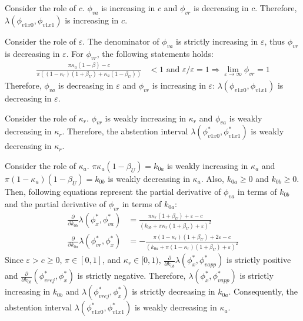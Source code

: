 \par Consider the role of $c$. $\phi_{va}$ is increasing in $c$ and $\phi_{vr}$ is decreasing in $c$. Therefore, $\lambda(\phi_{v1x0},\phi_{v1x1})$ is increasing in $c$. 

\par Consider the role of $\varepsilon$. The denominator of $\phi_{va}$ is strictly increasing in $\varepsilon$, thus $\phi_{vr}$ is decreasing in $\varepsilon$. For $\phi_{vr}$, the following statements holds:
\begin{align*}
\frac{\pi \kappa_{a} (1-\beta) - c}{\pi ( (1-\kappa_{r}) (1+\beta_U) + \kappa_{a} (1-\beta_U))} &< 1 \text{ and } \varepsilon/\varepsilon = 1 \Rightarrow \lim_{\varepsilon \to \infty} \phi_{vr} = 1 
\end{align*}
\noindent Therefore, $\phi_{va}$ is decreasing in $\varepsilon$ and $\phi_{vr}$ is increasing in $\varepsilon$: $\lambda(\phi_{v1x0},\phi_{v1x1})$ is decreasing in $\varepsilon$.

\par Consider the role of $\kappa_{r}$. $\phi_{vr}$ is weakly increasing in $\kappa_{r}$ and $\phi_{va}$ is weakly decreasing in $\kappa_{r}$. Therefore, the abstention interval $\lambda (\phi^*_{v1x0}, \phi^*_{v1x1})$ is weakly decreasing in $\kappa_{r}$. 

\par Consider the role of $\kappa_{a}$. $\pi \kappa_{a} (1-\beta_U)= k_{0a}$ is weakly increasing in  $\kappa_{a}$  and $\pi (1-\kappa_{a}) (1-\beta_U) = k_{0b}$ is weakly decreasing in $\kappa_{a}$. Also, $k_{0a} \geq 0$ and $k_{0b} \geq 0$. Then, following equations represent the partial derivative of $\phi_{va}$ in terms of $k_{0b}$ and the partial derivative of $\phi_{vr}$ in terms of $k_{0a}$:
\begin{align*}
\frac{\partial}{\partial k_{0b}} \lambda (\phi^*_x, \phi^*_{va}) &= \frac{  \pi \kappa_{r}(1+\beta_U) + \varepsilon - c}{(k_{0b} + \pi \kappa_{r}(1+\beta_U) + \varepsilon)^2} \\
\frac{\partial}{\partial k_{0a}} \lambda (\phi^*_{vr}, \phi^*_x) &=  - \frac{\pi (1-\kappa_{r}) (1 + \beta_U) + 2 \varepsilon - c}{(k_{0a} + \pi (1-\kappa_{r}) (1+\beta_U) + \varepsilon)^2} 
\end{align*}
\noindent Since $\varepsilon > c \geq 0$, $\pi \in [0,1]$, and $\kappa_{r} \in [0,1)$, $\frac{\partial}{\partial k_{0b}} \lambda (\phi^*_x, \phi^*_{vapp}) $ is strictly positive and $ \frac{\partial}{\partial k_{0b}} (\phi^*_{vrej}, \phi^*_x)$ is strictly negative. Therefore, $\lambda (\phi^*_x, \phi^*_{vapp})$ is strictly increasing in $k_{0b}$ and $\lambda (\phi^*_{vrej}, \phi^*_x)$ is strictly decreasing in $k_{0a}$. Consequently, the abstention interval $\lambda (\phi^*_{v1x0}, \phi^*_{v1x1})$ is weakly decreasing in $\kappa_{a}$. 

